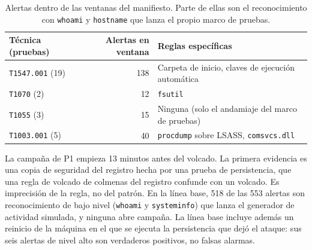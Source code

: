 \begin{table}[H]
\centering
\small
\begin{tabular}{|l|r|l|}
\hline
\textbf{Técnica (pruebas)} & \textbf{Alertas en ventana} & \textbf{Reglas específicas} \\
\hline
\texttt{T1547.001} (19) & 138 & Carpeta de inicio, claves de ejecución automática \\
\texttt{T1070} (2) & 12 & \texttt{fsutil} \\
\texttt{T1055} (3) & 15 & Ninguna (solo el andamiaje del marco de pruebas) \\
\texttt{T1003.001} (5) & 40 & \texttt{procdump} sobre LSASS, \texttt{comsvcs.dll} \\
\hline
\end{tabular}
\caption{Alertas dentro de las ventanas del manifiesto. Parte de ellas son el reconocimiento con
\texttt{whoami} y \texttt{hostname} que lanza el propio marco de pruebas.}
\end{table}

La campaña de P1 empieza 13 minutos antes del volcado. La primera evidencia es una copia de
seguridad del registro hecha por una prueba de persistencia, que una regla de volcado de colmenas
del registro confunde con un volcado. Es imprecisión de la regla, no del patrón. En la línea base,
518 de las 553 alertas son reconocimiento de bajo nivel (\texttt{whoami} y \texttt{systeminfo}) que
lanza el generador de actividad simulada, y ninguna abre campaña. La línea base incluye además un
reinicio de la máquina en el que se ejecuta la persistencia que dejó el ataque: sus seis alertas de
nivel alto son verdaderos positivos, no falsas alarmas.
